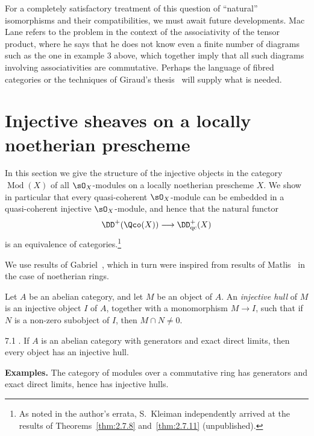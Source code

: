 For a completely satisfactory treatment of this question of ``natural'' isomorphisms and their compatibilities, we must await future developments. Mac Lane \cite[pp.~14,15]{12} refers to the problem in the context of the associativity of the tensor product, where he says that he does not know even a finite number of diagrams such as the one in example 3 above, which together imply that all such diagrams involving associativities are commutative. Perhaps the language of fibred categories \cite[--61, expos\'e~VI]{SGA} or the techniques of Giraud's thesis~\cite{6} will supply what is needed.

\section{Injective sheaves on a locally noetherian prescheme}\label{sec:2.7}

In this section we give the structure of the injective objects in the category $\operatorname{Mod}(X)$ of all $\sO_X$-modules on a locally noetherian prescheme $X$. We show in particular that every quasi-coherent $\sO_X$-module can be embedded in a quasi-coherent injective $\sO_X$-module, and hence that the natural functor
\[
\DD^+(\Qco(X)) \longrightarrow \DD_{\mathrm{qc}}^+(X)
\]
is an equivalence of categories.\footnote{As noted in the author's errata, S.~Kleiman independently arrived at the results of Theorems~\ref{thm:2.7.8} and~\ref{thm:2.7.11} (unpublished).}

We use results of Gabriel~\cite{5}, which in turn were inspired from results of Matlis~\cite{13} in the case of noetherian rings.

\begin{definition*}
Let $A$ be an abelian category, and let $M$ be an object of $A$. An \emph{injective hull} of $M$ is an injective object $I$ of $A$, together with a monomorphism $M\to I$, such that if $N$ is a non-zero subobject of $I$, then $M\cap N\neq 0$.
\end{definition*}

\begin{booktheorem}{7.1}\label{thm:2.7.1}
\cite[\nopp Ch.~II, Thm.~2]{5}. If $A$ is an abelian category with generators and exact direct limits, then every object has an injective hull.
\end{booktheorem}

\textbf{Examples.}
The category of modules over a commutative ring has generators and exact direct limits, hence has injective hulls.

